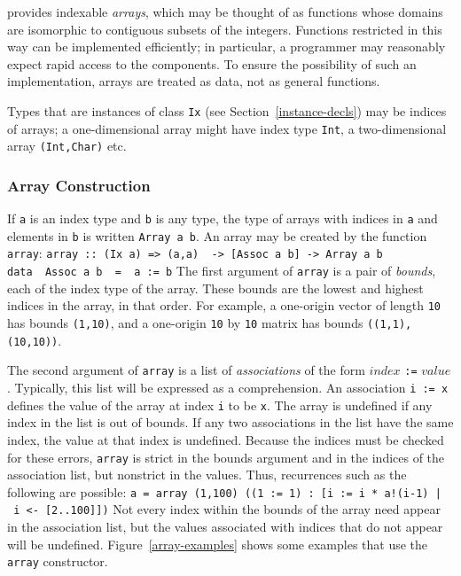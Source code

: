 {\Haskell{} provides indexable {\em arrays}, which may be thought of as
functions whose domains are isomorphic to contiguous subsets of the
integers.
Functions restricted in this way can be
implemented efficiently; in particular, a programmer may
reasonably expect rapid access to the components.  To ensure
the possibility of such an implementation, arrays are treated as data, not as
general functions.

Types that are instances of class \mbox{\tt Ix} (see
Section~\ref{instance-decls}) may be indices of arrays; a one-dimensional 
array might have index type \mbox{\tt Int}, a two-dimensional array
\mbox{\tt (Int,Char)} etc.

\subsubsection{Array Construction}

If \mbox{\tt a} is an index type and \mbox{\tt b} is any type, the type of arrays with
indices in \mbox{\tt a} and elements in \mbox{\tt b} is written \mbox{\tt Array\ a\ b}.
An array may be created by the function \mbox{\tt array}:
\bprog
\mbox{\tt array\ ::\ (Ix\ a)\ =>\ (a,a)\ \ ->\ [Assoc\ a\ b]\ ->\ Array\ a\ b}\\
\mbox{\tt data\ \ Assoc\ a\ b\ \ =\ \ a\ :=\ b}
\eprog{}\indextt{:=}
The first argument of \mbox{\tt array} is a pair of {\em bounds}, each of the
index type of the array.  These bounds are the lowest and
highest indices in the array, in that order.  For example, a
one-origin vector of length \mbox{\tt 10} has bounds \mbox{\tt (1,10)}, and a one-origin \mbox{\tt 10}
by \mbox{\tt 10} matrix has bounds \mbox{\tt ((1,1),(10,10))}.

The second argument of \mbox{\tt array} is a list of {\em associations}
of the form $index$ \mbox{\tt :=} $value$.  Typically, this list will
be expressed as a comprehension.  An association \mbox{\tt i\ :=\ x} defines the
value of the array at index \mbox{\tt i} to be \mbox{\tt x}.  The array is undefined if
any index in the list is out of bounds.  If any two associations in the
list have the same index, the value at that index is undefined.
Because the indices must be checked for these errors, \mbox{\tt array} is
strict in the bounds argument and in the indices of the association list,
but nonstrict in the values.  Thus, recurrences such as the following are
possible:
\bprog
\mbox{\tt a\ =\ array\ (1,100)\ ((1\ :=\ 1)\ :\ [i\ :=\ i\ *\ a!(i-1)\ |\ i\ <-\ [2..100]])}
\eprog
Not every index within the bounds of the array need
appear in the association list, but the values associated with indices
that do not appear will be undefined.
Figure~\ref{array-examples} shows some examples that use the
\mbox{\tt array} constructor.

}

